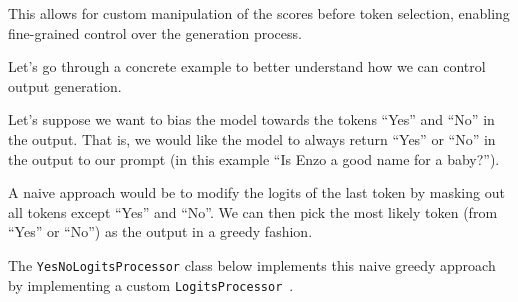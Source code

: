 This allows for custom manipulation of the scores before token selection, enabling fine-grained control over the generation process.

Let's go through a concrete example to better understand how we can control output generation.

Let's suppose we want to bias the model towards the tokens ``Yes'' and ``No'' in the output. That is, we would like the model to always return ``Yes'' or ``No'' in the output to our prompt (in this example ``Is Enzo a good name for a baby?''). 

A naive approach would be to modify the logits of the last token by masking out all tokens except ``Yes'' and ``No''. We can then pick the most likely token (from ``Yes'' or ``No'') as the output in a greedy fashion.

The \texttt{YesNoLogitsProcessor} class below implements this naive greedy approach by implementing a custom \texttt{LogitsProcessor}~.

